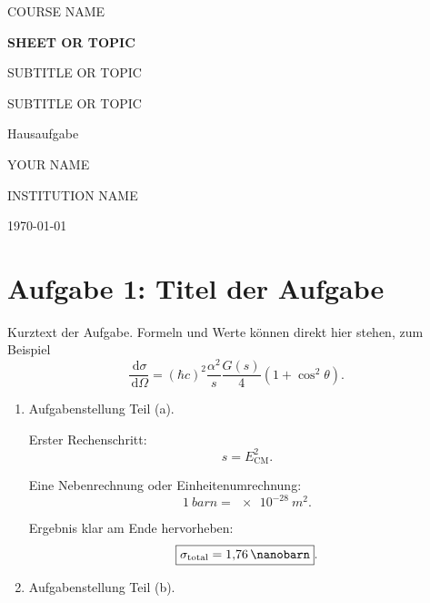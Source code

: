 \documentclass[11pt,a4paper]{scrartcl}
\newcommand{\CourseTitle}{COURSE NAME}
\newcommand{\DocumentKind}{DOCUMENT KIND}
\newcommand{\DocumentTitle}{DOCUMENT TITLE}
\newcommand{\DocumentSubtitle}{}
\newcommand{\AuthorName}{YOUR NAME}
\newcommand{\InstitutionName}{INSTITUTION NAME}
\newcommand{\SubmissionDate}{\today}
\newcommand{\makeuniversitytitle}{%
    \begin{titlepage}
        \centering
        \vspace*{2cm}
        {\Large \CourseTitle\par}
        \vspace{1.2cm}
        {\huge\bfseries \DocumentTitle\par}
        \ifx\DocumentSubtitle\empty\else
            \vspace{0.4cm}
            {\Large \DocumentSubtitle\par}
        \fi
        \vspace{1cm}
        {\Large \DocumentKind\par}
        \vfill
        {\large \AuthorName\par}
        \vspace{0.2cm}
        {\large \InstitutionName\par}
        \vspace{0.8cm}
        {\large \SubmissionDate\par}
    \end{titlepage}
    \pagenumbering{arabic}
}
\renewcommand{\CourseTitle}{COURSE NAME}
\renewcommand{\DocumentKind}{Hausaufgabe}
\renewcommand{\DocumentTitle}{SHEET OR TOPIC}
\renewcommand{\DocumentSubtitle}{SUBTITLE OR TOPIC}
\renewcommand{\AuthorName}{YOUR NAME}
\renewcommand{\InstitutionName}{INSTITUTION NAME}
\newcommand{\paren}[1]{\left( #1 \right)}
\newcommand{\dd}{\,\mathrm{d}}
\newcommand{\hbarc}{\hbar c}
\newcommand{\diffxs}{\frac{\dd\sigma}{\dd\Omega}}
\newcommand{\totalxs}{\sigma_{\mathrm{total}}}
\newcommand{\Ecm}{E_{\mathrm{CM}}}
\theoremstyle{definition}
\theoremstyle{plain}
\theoremstyle{remark}
\begin{document}
\makeuniversitytitle
\tableofcontents
\newpage



\section{Aufgabe 1: Titel der Aufgabe}

Kurztext der Aufgabe. Formeln und Werte können direkt hier stehen, zum Beispiel
\[
    \diffxs = (\hbarc)^2 \frac{\alpha^2}{s}\frac{G(s)}{4}\paren{1+\cos^2\theta}.
\]

\begin{enumerate}[label=(\alph*)]
    \item Aufgabenstellung Teil (a).

    \begin{calculationbox}
        Erster Rechenschritt:
        \[
            s = \Ecm^2.
        \]

        \begin{sidecalcbox}
            Eine Nebenrechnung oder Einheitenumrechnung:
            \[
                \SI{1}{barn}=\SI{e-28}{m^2}.
            \]
        \end{sidecalcbox}
    \end{calculationbox}

    \begin{answerbox}
        Ergebnis klar am Ende hervorheben:
        \[
            \boxed{\totalxs = \SI{1.76}{\nanobarn}}.
        \]
    \end{answerbox}

    \item Aufgabenstellung Teil (b).

    \begin{calculationbox}[title=Plot-Skizze]
        \begin{center}
        \end{center}
    \end{calculationbox}
\end{enumerate}
\end{document}
